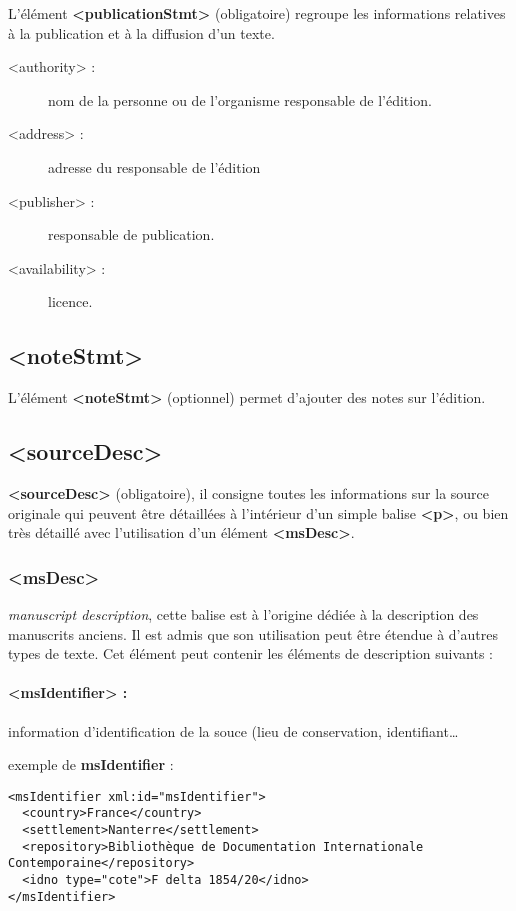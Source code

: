 \documentclass[18pt,a4paper,oneside]{book} %
\begin{document}
L'élément \textbf{<publicationStmt>} (obligatoire) regroupe les informations relatives à la publication et à la diffusion d'un texte.
\bigskip 
\begin{description}
\item [<authority> : ]nom de la personne ou de l'organisme responsable de l'édition.
\item [<address> : ]adresse du responsable de l'édition
\item [<publisher> : ]responsable de publication.
\item [<availability> : ]licence.  
\end{description}

\subsection{<noteStmt>}

L'élément \textbf{<noteStmt>} (optionnel) permet d'ajouter des notes sur l'édition.

\subsection{<sourceDesc>}

\textbf{<sourceDesc>} (obligatoire), il consigne toutes les informations sur la source originale qui peuvent être détaillées à l'intérieur d'un simple balise \textbf{<p>}, ou bien très détaillé avec l'utilisation d'un élément \textbf{<msDesc>}.
\subsubsection{<msDesc>}

\textit{manuscript description}, cette balise est à l'origine dédiée à la description des manuscrits anciens. Il est admis que son utilisation peut être étendue à d'autres types de texte. Cet élément peut contenir les éléments de description suivants :

\paragraph{<msIdentifier> :}

information d'identification de la souce (lieu de conservation, identifiant\dots
\bigskip 

exemple de \textbf{msIdentifier} :
\begin{lstlisting}
<msIdentifier xml:id="msIdentifier">
  <country>France</country>
  <settlement>Nanterre</settlement>
  <repository>Bibliothèque de Documentation Internationale Contemporaine</repository>
  <idno type="cote">F delta 1854/20</idno>
</msIdentifier>
\end{lstlisting}
\end{document}
